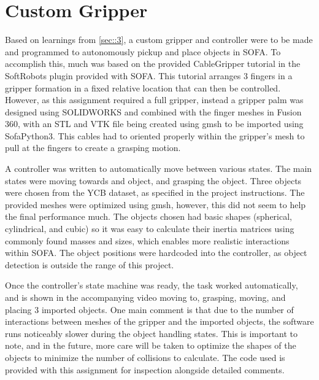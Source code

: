 \documentclass[a4paper, onecolumn, 10pt]{IEEEtran}
\begin{document}
\section{Custom Gripper}
\label{sec::4}
Based on learnings from \ref{sec::3}, a custom gripper and controller were to be made and programmed to autonomously pickup and place objects in SOFA. To accomplish this, much was based on the provided CableGripper tutorial in the SoftRobots plugin provided with SOFA. This tutorial arranges 3 fingers in a gripper formation in a fixed relative location that can then be controlled. However, as this assignment required a full gripper, instead a gripper palm was designed using SOLIDWORKS and combined with the finger meshes in Fusion 360, with an STL and VTK file being created using gmsh to be imported using SofaPython3. This cables had to oriented properly within the gripper's mesh to pull at the fingers to create a grasping motion.

A controller was written to automatically move between various states. The main states were moving towards and object, and grasping the object. Three objects were chosen from the YCB dataset, as specified in the project instructions. The provided meshes were optimized using gmsh, however, this did not seem to help the final performance much. The objects chosen had basic shapes (spherical, cylindrical, and cubic) so it was easy to calculate their inertia matrices using commonly found masses and sizes, which enables more realistic interactions within SOFA. The object positions were hardcoded into the controller, as object detection is outside the range of this project.

Once the controller's state machine was ready, the task worked automatically, and is shown in the accompanying video moving to, grasping, moving, and placing 3 imported objects. One main comment is that due to the number of interactions between meshes of the gripper and the imported objects, the software runs noticeably slower during the object handling states. This is important to note, and in the future, more care will be taken to optimize the shapes of the objects to minimize the number of collisions to calculate. The code used is provided with this assignment for inspection alongside detailed comments.
\end{document}
